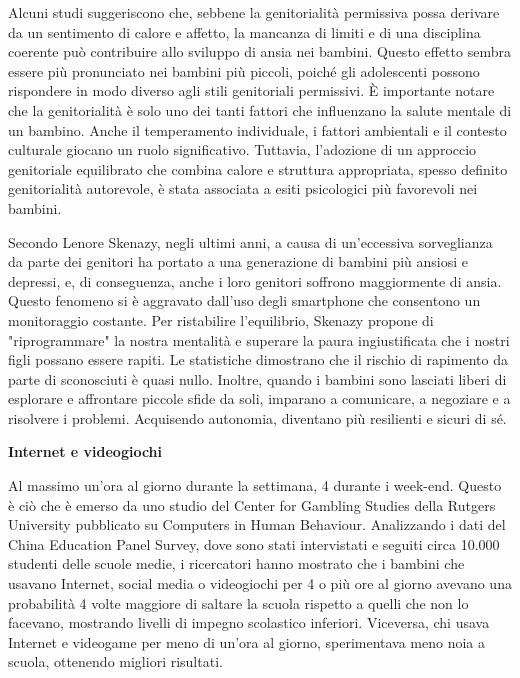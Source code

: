 \documentclass[12pt]{book} %
\begin{document}
Alcuni studi   suggeriscono che, sebbene la genitorialità permissiva possa derivare da un sentimento di calore e affetto, la mancanza di limiti e di una disciplina coerente può contribuire allo sviluppo di ansia nei bambini. Questo effetto sembra essere più pronunciato nei bambini più piccoli, poiché gli adolescenti possono rispondere in modo diverso agli stili genitoriali permissivi. È importante notare che la genitorialità è solo uno dei tanti fattori che influenzano la salute mentale di un bambino. Anche il temperamento individuale, i fattori ambientali e il contesto culturale giocano un ruolo significativo. Tuttavia, l'adozione di un approccio genitoriale equilibrato che combina calore e struttura appropriata, spesso definito genitorialità autorevole, è stata associata a esiti psicologici più favorevoli nei bambini.

Secondo Lenore Skenazy, negli ultimi anni, a causa di un'eccessiva sorveglianza da parte dei genitori ha portato a una generazione di bambini più ansiosi e depressi, e, di conseguenza, anche i loro genitori soffrono maggiormente di ansia. Questo fenomeno si è aggravato dall'uso degli smartphone che consentono un monitoraggio costante.
Per ristabilire l'equilibrio, Skenazy propone di "riprogrammare" la nostra mentalità e superare la paura ingiustificata che i nostri figli possano essere rapiti. Le statistiche dimostrano che il rischio di rapimento da parte di sconosciuti è quasi nullo. Inoltre, quando i bambini sono lasciati liberi di esplorare e affrontare piccole sfide da soli, imparano a comunicare, a negoziare e a risolvere i problemi. Acquisendo autonomia, diventano più resilienti e sicuri di sé.

\textbf{Internet e videogiochi}

Al massimo un'ora al giorno durante la settimana, 4 durante i week-end. Questo è ciò che è emerso da uno studio del
Center for Gambling Studies della Rutgers University pubblicato su Computers in Human Behaviour. Analizzando i dati del
China Education Panel Survey, dove sono stati intervistati e seguiti circa 10.000 studenti delle scuole medie, i
ricercatori hanno mostrato che i bambini che usavano Internet, social media o videogiochi per 4 o più ore al giorno
avevano una probabilità 4 volte maggiore di saltare la scuola rispetto a quelli che non lo facevano, mostrando livelli
di impegno scolastico inferiori. Viceversa, chi usava Internet e videogame per meno di un'ora al giorno, sperimentava
meno noia a scuola, ottenendo migliori risultati. 
\end{document}

